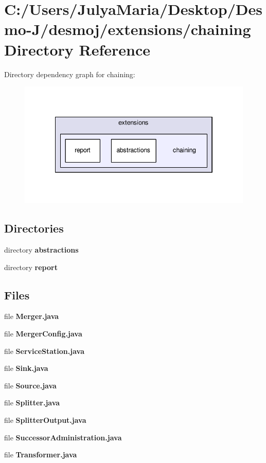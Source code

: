\section{C\-:/\-Users/\-Julya\-Maria/\-Desktop/\-Desmo-\/\-J/desmoj/extensions/chaining Directory Reference}
\label{dir_7ec4acfc73b88b36f648da7929eeabde}
Directory dependency graph for chaining\-:
\nopagebreak
\begin{figure}[H]
\begin{center}
\leavevmode
\includegraphics[width=342pt]{dir_7ec4acfc73b88b36f648da7929eeabde_dep}
\end{center}
\end{figure}
\subsection*{Directories}
\begin{DoxyCompactItemize}
\item 
directory {\bf abstractions}
\item 
directory {\bf report}
\end{DoxyCompactItemize}
\subsection*{Files}
\begin{DoxyCompactItemize}
\item 
file {\bfseries Merger.\-java}
\item 
file {\bfseries Merger\-Config.\-java}
\item 
file {\bfseries Service\-Station.\-java}
\item 
file {\bfseries Sink.\-java}
\item 
file {\bfseries Source.\-java}
\item 
file {\bfseries Splitter.\-java}
\item 
file {\bfseries Splitter\-Output.\-java}
\item 
file {\bfseries Successor\-Administration.\-java}
\item 
file {\bfseries Transformer.\-java}
\end{DoxyCompactItemize}
